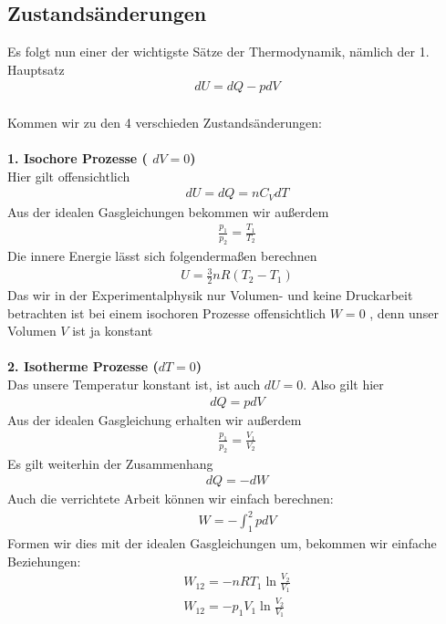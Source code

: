 \documentclass[a4paper,12pt]{report}
\begin{document}
\subsection{Zustandsänderungen}
Es folgt nun einer der wichtigste Sätze der Thermodynamik, nämlich der 1. Hauptsatz
\begin{align}
dU = dQ -pdV
\end{align}
\\
Kommen wir zu den 4 verschieden Zustandsänderungen: \\
\\
\textbf{1. Isochore Prozesse ( $dV = 0$)} \\
Hier gilt offensichtlich
\begin{align}
dU = dQ = nC_V dT
\end{align}
Aus der idealen Gasgleichungen bekommen wir außerdem 
\begin{align}
\frac{p_1}{p_2} = \frac{T_1}{T_2}
\end{align}
Die innere Energie lässt sich folgendermaßen berechnen
\begin{align}
U = \frac{3}{2}nR(T_2-T_1)
\end{align}
Das wir in der Experimentalphysik nur Volumen- und keine Druckarbeit betrachten ist bei einem isochoren Prozesse offensichtlich $W=0$ , denn unser Volumen $V$ ist ja konstant \\
\\
\textbf{2. Isotherme Prozesse ($ dT = 0 $)} \\
Das unsere Temperatur konstant ist, ist auch $dU = 0$. Also gilt hier 
\begin{align}
dQ = pdV
\end{align}
Aus der idealen Gasgleichung erhalten wir außerdem 
\begin{align}
\frac{p_1}{p_2} = \frac{V_1}{V_2}
\end{align}
Es gilt weiterhin der Zusammenhang 
\begin{align}
dQ = -dW
\end{align}
Auch die verrichtete Arbeit können wir einfach berechnen: 
\begin{align}
W = - \int_{1}^{2} pdV
\end{align}
Formen wir dies mit der idealen Gasgleichungen um, bekommen wir einfache Beziehungen: 
\begin{align}
W_{12} = -nRT_1\ln{\frac{V_2}{V_1}} \\
W_{12} = -p_1V_1\ln{\frac{V_2}{V_1}}
\end{align}
\end{document}
